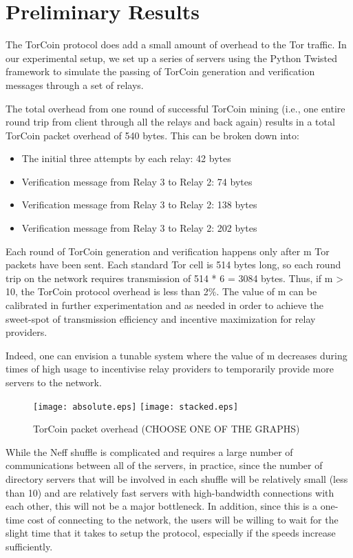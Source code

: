 \section{Preliminary Results}

The TorCoin protocol does add a small amount of overhead to the Tor traffic. In our experimental setup, we set up a series of servers using the Python Twisted framework to simulate the passing of TorCoin generation and verification messages through a set of relays. 

The total overhead from one round of successful TorCoin mining (i.e., one entire round trip from client through all the relays and back again) results in a total TorCoin packet overhead of 540 bytes. This can be broken down into: 
\begin{itemize}
\item The initial three attempts by each relay: 42 bytes
\item Verification message from Relay 3 to Relay 2: 74 bytes
\item Verification message from Relay 3 to Relay 2: 138 bytes
\item Verification message from Relay 3 to Relay 2: 202 bytes
\end{itemize}

Each round of TorCoin generation and verification happens only after m Tor packets have been sent. Each standard Tor cell is 514 bytes long, so each round trip on the network requires transmission of 514 * 6 = 3084 bytes. Thus, if m > 10, the TorCoin protocol overhead is less than 2\%. The value of m can be calibrated in further experimentation and as needed in order to achieve the sweet-spot of transmission efficiency and incentive maximization for relay providers.

Indeed, one can envision a tunable system where the value of m decreases during times of high usage to incentivise relay providers to temporarily provide more servers to the network.

\begin{figure}
  \centering
    \texttt{[image: absolute.eps]}
    \texttt{[image: stacked.eps]}
  \caption{TorCoin packet overhead (CHOOSE ONE OF THE GRAPHS)}
\end{figure}

While the Neff shuffle is complicated and requires a large number of communications between all of the servers, in practice, since the number of directory servers that will be involved in each shuffle will be relatively small (less than 10) and are relatively fast servers with high-bandwidth connections with each other, this will not be a major bottleneck. In addition, since this is a one-time cost of connecting to the network, the users will be willing to wait for the slight time that it takes to setup the protocol, especially if the speeds increase sufficiently.